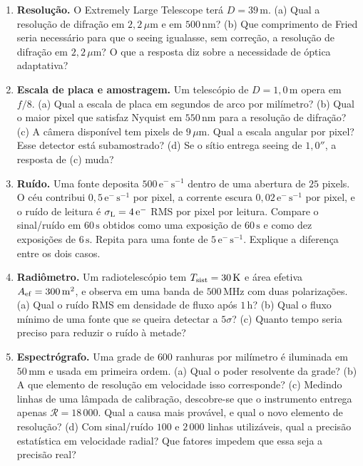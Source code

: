 \documentclass[11pt,a4paper]{article}
\begin{document}
\begin{enumerate}[leftmargin=*,itemsep=5pt]
\item \textbf{Resolução.} O Extremely Large Telescope terá $D=39\,\mathrm{m}$. (a) Qual a resolução de difração em
$2{,}2\,\mu\mathrm{m}$ e em $500\,\mathrm{nm}$? (b) Que comprimento de Fried seria necessário para que o seeing
igualasse, sem correção, a resolução de difração em $2{,}2\,\mu\mathrm{m}$? O que a resposta diz sobre a
necessidade de óptica adaptativa?

\item \textbf{Escala de placa e amostragem.} Um telescópio de $D=1{,}0\,\mathrm{m}$ opera em $f/8$. (a) Qual a
escala de placa em segundos de arco por milímetro? (b) Qual o maior pixel que satisfaz Nyquist em
$550\,\mathrm{nm}$ para a resolução de difração? (c) A câmera disponível tem pixels de $9\,\mu\mathrm{m}$. Qual a
escala angular por pixel? Esse detector está subamostrado? (d) Se o sítio entrega seeing de $1{,}0''$, a resposta
de (c) muda?

\item \textbf{Ruído.} Uma fonte deposita $500\,\mathrm{e^-\,s^{-1}}$ dentro de uma abertura de $25$ pixels. O céu
contribui $0{,}5\,\mathrm{e^-\,s^{-1}}$ por pixel, a corrente escura $0{,}02\,\mathrm{e^-\,s^{-1}}$ por pixel, e o
ruído de leitura é $\sigma_{\rm L}=4\,\mathrm{e^-}$ RMS por pixel por leitura. Compare o sinal/ruído em
$60\,\mathrm{s}$ obtidos como uma exposição de $60\,\mathrm{s}$ e como dez exposições de $6\,\mathrm{s}$. Repita
para uma fonte de $5\,\mathrm{e^-\,s^{-1}}$. Explique a diferença entre os dois casos.

\item \textbf{Radiômetro.} Um radiotelescópio tem $T_{\rm sist}=30\,\mathrm{K}$ e área efetiva
$A_{\rm ef}=300\,\mathrm{m^2}$, e observa em uma banda de $500\,\mathrm{MHz}$ com duas polarizações. (a) Qual o
ruído RMS em densidade de fluxo após $1\,\mathrm{h}$? (b) Qual o fluxo mínimo de uma fonte que se queira detectar
a $5\sigma$? (c) Quanto tempo seria preciso para reduzir o ruído à metade?

\item \textbf{Espectrógrafo.} Uma grade de $600$ ranhuras por milímetro é iluminada em $50\,\mathrm{mm}$ e
usada em primeira ordem. (a) Qual o poder resolvente da grade? (b) A que elemento de resolução em velocidade isso
corresponde? (c) Medindo linhas de uma lâmpada de calibração, descobre-se que o instrumento entrega apenas
$\mathcal{R}=18\,000$. Qual a causa mais provável, e qual o novo elemento de resolução? (d) Com sinal/ruído $100$
e $2\,000$ linhas utilizáveis, qual a precisão estatística em velocidade radial? Que fatores impedem que essa
seja a precisão real?


\end{enumerate}
\end{document}

